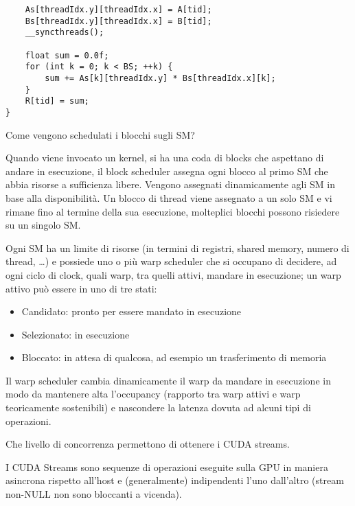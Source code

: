 \begin{questions}
\begin{solution}
\begin{verbatim}
    As[threadIdx.y][threadIdx.x] = A[tid];
    Bs[threadIdx.y][threadIdx.x] = B[tid];
    __syncthreads();
	
    float sum = 0.0f;
    for (int k = 0; k < BS; ++k) {
        sum += As[k][threadIdx.y] * Bs[threadIdx.x][k];
    }
    R[tid] = sum;
}
    	\end{verbatim}
    \end{solution}
    
    \question Come vengono schedulati i blocchi sugli SM?
    
    \begin{solution}
        Quando viene invocato un kernel, si ha una coda di blocks che aspettano di andare in esecuzione, il block scheduler assegna ogni blocco al primo SM che abbia risorse a sufficienza libere. Vengono assegnati dinamicamente agli SM in base alla disponibilità. Un blocco di thread viene assegnato a un solo SM e vi rimane fino al termine della sua esecuzione, molteplici blocchi possono risiedere su un singolo SM.
        
        Ogni SM ha un limite di risorse (in termini di registri, shared memory, numero di thread, \dots) e possiede uno o più warp scheduler che si occupano di decidere, ad ogni ciclo di clock, quali warp, tra quelli attivi, mandare in esecuzione; un warp attivo può essere in uno di tre stati: 
        \begin{itemize}
            \item Candidato: pronto per essere mandato in esecuzione
            
            \item Selezionato: in esecuzione
            
            \item Bloccato: in attesa di qualcosa, ad esempio un trasferimento di memoria
        \end{itemize}
        
        Il warp scheduler cambia dinamicamente il warp da mandare in esecuzione in modo da mantenere alta l'occupancy (rapporto tra warp attivi e warp teoricamente sostenibili) e nascondere la latenza dovuta ad alcuni tipi di operazioni.
    \end{solution}
    
    \question Che livello di concorrenza permettono di ottenere i CUDA streams.
    
    \begin{solution}
        I CUDA Streams sono sequenze di operazioni eseguite sulla GPU in maniera asincrona rispetto all'host e (generalmente) indipendenti l'uno dall'altro (stream non-NULL non sono bloccanti a vicenda).
        

\end{solution}
\end{questions}
